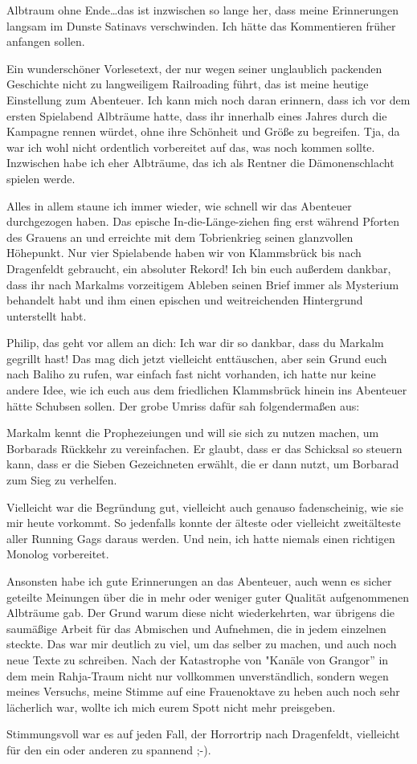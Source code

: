 Albtraum ohne Ende\dots das ist inzwischen so lange her, dass meine Erinnerungen langsam im Dunste Satinavs verschwinden. Ich hätte das Kommentieren früher anfangen sollen.\par
Ein wunderschöner Vorlesetext, der nur wegen seiner unglaublich packenden Geschichte nicht zu langweiligem Railroading führt, das ist meine heutige Einstellung zum Abenteuer. Ich kann mich noch daran erinnern, dass ich vor dem ersten Spielabend Albträume hatte, dass ihr innerhalb eines Jahres durch die Kampagne rennen würdet, ohne ihre Schönheit und Größe zu begreifen. Tja, da war ich wohl nicht ordentlich vorbereitet auf das, was noch kommen sollte. Inzwischen habe ich eher Albträume, das ich als Rentner die Dämonenschlacht spielen werde.\par
Alles in allem staune ich immer wieder, wie schnell wir das Abenteuer durchgezogen haben. Das epische In-die-Länge-ziehen fing erst während Pforten des Grauens an und erreichte mit dem Tobrienkrieg seinen glanzvollen Höhepunkt. Nur vier Spielabende haben wir von Klammsbrück bis nach Dragenfeldt gebraucht, ein absoluter Rekord!
Ich bin euch außerdem dankbar, dass ihr nach Markalms vorzeitigem Ableben seinen Brief immer als Mysterium behandelt habt und ihm einen epischen und weitreichenden Hintergrund unterstellt habt.\par
Philip, das geht vor allem an dich: Ich war dir so dankbar, dass du Markalm gegrillt hast! Das mag dich jetzt vielleicht enttäuschen, aber sein Grund euch nach Baliho zu rufen, war einfach fast nicht vorhanden, ich hatte nur keine andere Idee, wie ich euch aus dem friedlichen Klammsbrück hinein ins Abenteuer hätte Schubsen sollen. Der grobe Umriss dafür sah folgendermaßen aus:\par
Markalm kennt die Prophezeiungen und will sie sich zu nutzen machen, um Borbarads Rückkehr zu vereinfachen. Er glaubt, dass er das Schicksal so steuern kann, dass er die Sieben Gezeichneten erwählt, die er dann nutzt, um Borbarad zum Sieg zu verhelfen.\par
Vielleicht war die Begründung gut, vielleicht auch genauso fadenscheinig, wie sie mir heute vorkommt. So jedenfalls konnte der älteste oder vielleicht zweitälteste aller Running Gags daraus werden. Und nein, ich hatte niemals einen richtigen Monolog vorbereitet.\par
Ansonsten habe ich gute Erinnerungen an das Abenteuer, auch wenn es sicher geteilte Meinungen über die in mehr oder weniger guter Qualität aufgenommenen Albträume gab. Der Grund warum diese nicht wiederkehrten, war übrigens die saumäßige Arbeit für das Abmischen und Aufnehmen, die in jedem einzelnen steckte. Das war mir deutlich zu viel, um das selber zu machen, und auch noch neue Texte zu schreiben. Nach der Katastrophe von "Kanäle von Grangor'' in dem mein Rahja-Traum nicht nur vollkommen unverständlich, sondern wegen meines Versuchs, meine Stimme auf eine Frauenoktave zu heben auch noch sehr lächerlich war, wollte ich mich eurem Spott nicht mehr preisgeben.\par
Stimmungsvoll war es auf jeden Fall, der Horrortrip nach Dragenfeldt, vielleicht für den ein oder anderen zu spannend ;-).\par

